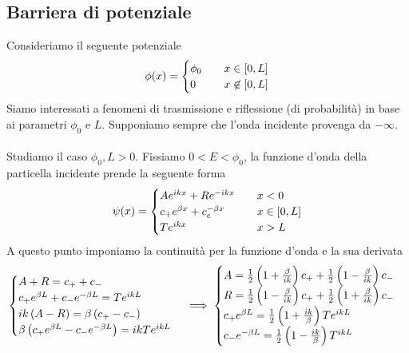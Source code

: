 \documentclass{article}
\begin{document}
\subsection{Barriera di potenziale}
Consideriamo il seguente potenziale
\begin{gather}
    \phi(x) = \begin{cases}
        \phi_0 \quad &x \in [0, L] \\
        0 \quad &x \not\in [0, L]
    \end{cases} \notag
\end{gather}
Siamo interessati a fenomeni di trasmissione e riflessione (di probabilità) in base ai parametri $\phi_0$ e $L$. Supponiamo sempre che l'onda incidente provenga da $-\infty$. \\ \\
Studiamo il caso $\phi_0, L > 0$. Fissiamo $0 < E < \phi_0$, la funzione d'onda della particella incidente prende la seguente forma
\begin{gather}
    \psi(x) = \begin{cases}
        Ae^{ikx} + Re^{-ikx} \quad &x < 0 \\
        c_+e^{\beta x} + c_e^{-\beta x} \quad &x \in [0, L] \\
        Te^{ikx} \quad &x > L 
    \end{cases} \notag
\end{gather}
A questo punto imponiamo la continuità per la funzione d'onda e la sua derivata
\begin{gather}
    \begin{cases}
        A + R = c_+ + c_- \\
        c_+e^{\beta L} + c_-e^{-\beta L} = Te^{ikL} \\
        ik\left( A - R \right) = \beta\left( c_+ - c_- \right) \\
        \beta\left( c_+e^{\beta L} -c_-e^{-\beta L} \right) = ikTe^{ikL}
    \end{cases} \implies 
    \begin{cases}
        A = \frac{1}{2}\left( 1 + \frac{\beta}{ik} \right)c_+ + \frac{1}{2}\left( 1 - \frac{\beta}{ik} \right)c_- \\
        R = \frac{1}{2}\left( 1 - \frac{\beta}{ik} \right)c_+ + \frac{1}{2}\left( 1 + \frac{\beta}{ik} \right)c_- \\
        c_+e^{\beta L} = \frac{1}{2}\left( 1 + \frac{ik}{\beta} \right)Te^{ikL} \\
        c_-e^{-\beta L} = \frac{1}{2}\left( 1 - \frac{ik}{\beta} \right)T^{ikL} 
    \end{cases} \notag
\end{gather}
\end{document}
